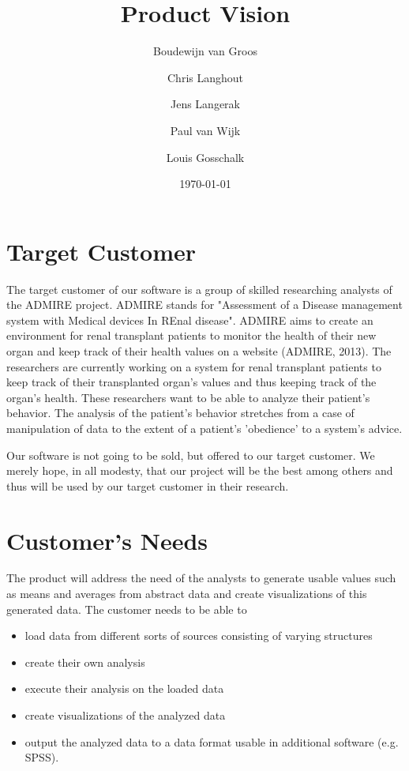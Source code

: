 \documentclass[a4paper]{article}
\title{Product Vision}
\author[1]{Boudewijn van Groos}
\author[2]{Chris Langhout}
\author[3]{Jens Langerak}
\author[4]{Paul van Wijk}
\author[5]{Louis Gosschalk}
\affil[1]{bvangroos \\
4229843}
\affil[2]{clanghout \\
4281705}
\affil[3]{jlangerak \\
4317327}
\affil[4]{pvanwijk \\
4285034}
\affil[5]{lgosschalk \\
4214528}
\date{\today}
\begin{document}
\maketitle
\tableofcontents
\newpage

\section{Target Customer}
The target customer of our software is a group of skilled researching analysts of the ADMIRE project. ADMIRE stands for "Assessment of a Disease management system with Medical devices In REnal disease". ADMIRE aims to create an environment for renal transplant patients to monitor the health of their new organ and keep track of their health values on a website (ADMIRE, 2013).
The researchers are currently working on a system for renal transplant patients to keep track of their transplanted organ's values and thus keeping track of the organ's health. These researchers want to be able to analyze their patient's behavior. The analysis of the patient's behavior stretches from a case of manipulation of data to the extent of a patient's 'obedience' to a system's advice. 
\par
Our software is not going to be sold, but offered to our target customer. We merely hope, in all modesty, that our project will be the best among others and thus will be used by our target customer in their research.

\section{Customer's Needs}
The product will address the need of the analysts to generate usable values such as means and averages from abstract data and create visualizations of this generated data. The customer needs to be able to 
\begin{itemize}
\item load data from different sorts of sources consisting of varying structures 
\item create their own analysis 
\item execute their analysis on the loaded data
\item create visualizations of the analyzed data
\item output the analyzed data to a data format usable in additional software (e.g. SPSS).
\end{itemize}
\end{document}
